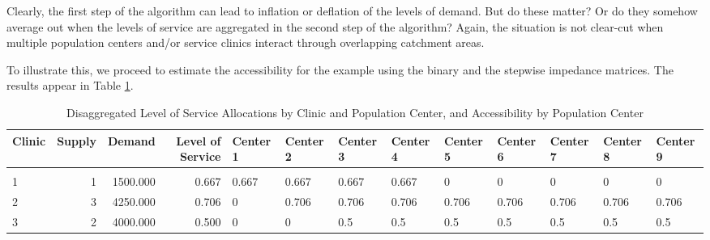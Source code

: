 \documentclass[10pt,letterpaper]{article}
\begin{document}
Clearly, the first step of the algorithm can lead to inflation or
deflation of the levels of demand. But do these matter? Or do they
somehow average out when the levels of service are aggregated in the
second step of the algorithm? Again, the situation is not clear-cut when
multiple population centers and/or service clinics interact through
overlapping catchment areas.

To illustrate this, we proceed to estimate the accessibility for the
example using the binary and the stepwise impedance matrices. The
results appear in Table \ref{tab:table-simulation-los-accessibility}.

\begin{landscape}\begin{table}[t]

\caption{\label{tab:table-simulation-los-accessibility}\label{tab:table-simulation-los-accessibility}Disaggregated Level of Service Allocations by Clinic and Population Center, and Accessibility by Population Center}
\centering
\fontsize{7}{9}\selectfont
\begin{tabular}{lrrrlllllllll}
\toprule
Clinic & Supply & Demand & Level of Service & Center 1 & Center 2 & Center 3 & Center 4 & Center 5 & Center 6 & Center 7 & Center 8 & Center 9\\
\midrule
\addlinespace[0.3em]
\multicolumn{13}{l}{\textbf{Binary Impedance}}\\
\hspace{1em}1 & 1 & 1500.000 & 0.667 & \textcolor[HTML]{46039F}{0.667} & \textcolor[HTML]{DE5E65}{0.667} & \textcolor[HTML]{F3854B}{0.667} & \textcolor[HTML]{F3874A}{0.667} & \textcolor[HTML]{FCCE25}{0} & \textcolor[HTML]{FCCE25}{0} & \textcolor[HTML]{FCCE25}{0} & \textcolor[HTML]{FCCE25}{0} & \textcolor[HTML]{FCCE25}{0}\\
\hspace{1em}2 & 3 & 4250.000 & 0.706 & \textcolor[HTML]{FCCE25}{0} & \textcolor[HTML]{D9586A}{0.706} & \textcolor[HTML]{F07F4F}{0.706} & \textcolor[HTML]{F0804E}{0.706} & \textcolor[HTML]{E26660}{0.706} & \textcolor[HTML]{A92296}{0.706} & \textcolor[HTML]{A92296}{0.706} & \textcolor[HTML]{E26660}{0.706} & \textcolor[HTML]{A92296}{0.706}\\
\hspace{1em}3 & 2 & 4000.000 & 0.500 & \textcolor[HTML]{FCCE25}{0} & \textcolor[HTML]{FCCE25}{0} & \textcolor[HTML]{FBA139}{0.5} & \textcolor[HTML]{FCA238}{0.5} & \textcolor[HTML]{F0804E}{0.5} & \textcolor[HTML]{D24F71}{0.5} & \textcolor[HTML]{D24F71}{0.5} & \textcolor[HTML]{F0804E}{0.5} & \textcolor[HTML]{D24F71}{0.5}\\

\end{tabular}
\end{table}
\end{landscape}
\end{document}
